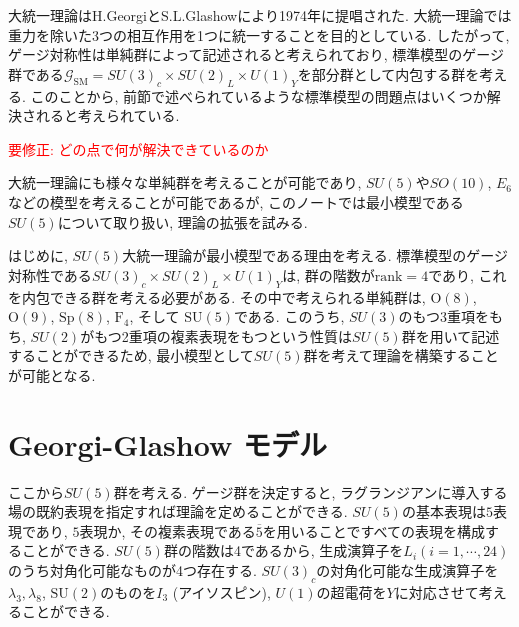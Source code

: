 % 
%
大統一理論はH.GeorgiとS.L.Glashowにより1974年に提唱された\cite{PhysRevLett.32.438}.
大統一理論では重力を除いた3つの相互作用を1つに統一することを目的としている.
したがって, ゲージ対称性は単純群によって記述されると考えられており, 標準模型のゲージ群である$\mathcal{G}_\text{SM}= SU(3)_c\times SU(2)_L\times U(1)_Y$を部分群として内包する群を考える.
このことから, 前節で述べられているような標準模型の問題点はいくつか解決されると考えられている.

\textcolor{red}{要修正: どの点で何が解決できているのか}

大統一理論にも様々な単純群を考えることが可能であり, $SU(5)$や$SO(10)$, $E_6$などの模型を考えることが可能であるが, このノートでは最小模型である$SU(5)$について取り扱い, 理論の拡張を試みる.

はじめに, $SU(5)$大統一理論が最小模型である理由を考える.
標準模型のゲージ対称性である$SU(3)_c\times SU(2)_L\times U(1)_Y$は, 群の階数が$\text{rank}=4$であり, これを内包できる群を考える必要がある.
その中で考えられる単純群は, $\text{O}(8)$, $\mathrm{O}(9)$, $\mathrm{Sp}(8)$, $\mathrm{F}_4$, そして $\mathrm{SU}(5)$である.
このうち, $SU(3)$のもつ3重項をもち, $SU(2)$がもつ2重項の複素表現をもつという性質は$SU(5)$群を用いて記述することができるため, 最小模型として$SU(5)$群を考えて理論を構築することが可能となる.

\section{Georgi-Glashow モデル}
ここから$SU(5)$群を考える.
ゲージ群を決定すると, ラグランジアンに導入する場の既約表現を指定すれば理論を定めることができる.
$SU(5)$の基本表現は$5$表現であり, $5$表現か, その複素表現である$\overline{5}$を用いることですべての表現を構成することができる.
$SU(5)$群の階数は4であるから, 生成演算子を$L_i$$(i=1,\cdots,24)$ のうち対角化可能なものが4つ存在する.
$SU(3)_c$の対角化可能な生成演算子を$\lambda_3,\lambda_8$, $\mathrm{SU}(2)$のものを$I_3$ (アイソスピン), $U(1)$の超電荷を$Y$に対応させて考えることができる.

